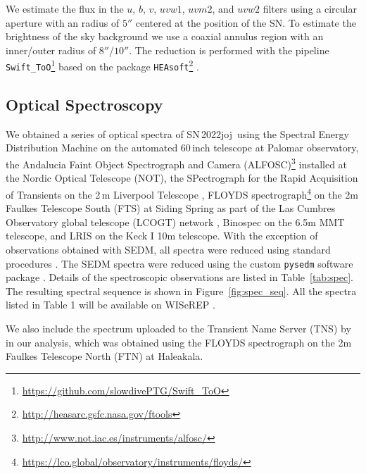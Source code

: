 \documentclass[twocolumn]{aastex631}
\newcommand{\sn}{SN\,2022joj}
\begin{document}
\begin{CJK*}{UTF8}{gbsn}
We estimate the flux in the $u$, $b$, $v$, $uvw1$, $uvm2$, and $uvw2$ filters using a circular aperture with an radius of $5''$ centered at the position of the SN. To estimate the brightness of the sky background we use a coaxial annulus region with an inner/outer radius of $8''$/$10''$. The reduction is performed with the pipeline \texttt{Swift\_ToO}\footnote{\url{https://github.com/slowdivePTG/Swift_ToO}} based on the package \texttt{HEAsoft}\footnote{\url{http://heasarc.gsfc.nasa.gov/ftools}} \citep{HEAsoft_2014}. 

\subsection{Optical Spectroscopy}\label{sec:optical_spec}

We obtained a series of optical spectra of \sn\ using the Spectral Energy Distribution Machine \citep[SEDM;][]{SEDM_2018} on the automated 60\,inch telescope \citep[P60;][]{P60_2006} at Palomar observatory, the Andalucia Faint Object Spectrograph and Camera (ALFOSC)\footnote{\url{http://www.not.iac.es/instruments/alfosc/}} installed at the Nordic Optical Telescope (NOT), the SPectrograph for the Rapid Acquisition of Transients \citep[SPRAT;][]{SPRAT_2014} on the 2\,m Liverpool Telescope \citep[LT;][]{LT_2004}, FLOYDS spectrograph\footnote{\url{https://lco.global/observatory/instruments/floyds/}} on the 2m Faulkes Telescope South (FTS) at Siding Spring as part of the Las Cumbres Observatory global telescope (LCOGT) network \citep{LCOGT_2013}, Binospec on the 6.5m MMT telescope, and LRIS on the Keck I 10m telescope. With the exception of observations obtained with SEDM, all spectra were reduced using standard procedures \citep[e.g.,][]{Matheson_2000}. The SEDM spectra were reduced using the custom \texttt{pysedm} software package \citep{Rigault_pysedm_2019}. Details of the spectroscopic observations are listed in Table~\ref{tab:spec}. The resulting spectral sequence is shown in Figure~\ref{fig:spec_seq}. All the spectra listed in Table 1 will be available on WISeREP \citep{wiserep_2012}.

We also include the spectrum uploaded to the Transient Name Server (TNS) by \citet{Newsome_2022TNSCR} in our analysis, which was obtained using the FLOYDS spectrograph on the 2m Faulkes Telescope North (FTN) at Haleakala.


\end{CJK*}
\end{document}
